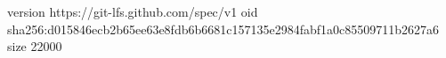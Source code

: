 version https://git-lfs.github.com/spec/v1
oid sha256:d015846ecb2b65ee63e8fdb6b6681c157135e2984fabf1a0c85509711b2627a6
size 22000
